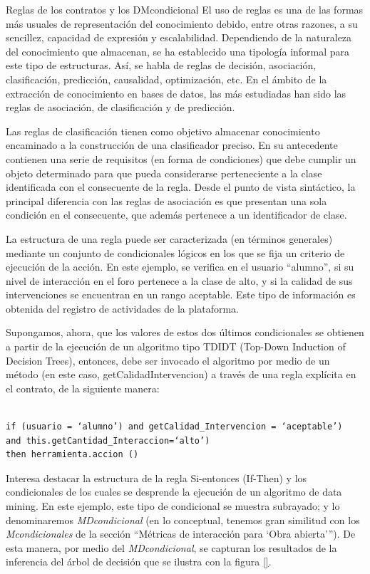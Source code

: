 {Reglas de los contratos y los DMcondicional El uso de reglas es una de las
formas más usuales de representación del conocimiento debido, entre otras
razones, a su sencillez, capacidad de expresión y escalabilidad. Dependiendo de
la naturaleza del conocimiento que almacenan, se ha establecido una tipología
informal para este tipo de estructuras. Así, se habla de reglas de decisión,
asociación, clasificación, predicción, causalidad, optimización, etc. En el
ámbito de la extracción de conocimiento en bases de datos, las más estudiadas
han sido las reglas de asociación, de clasificación y de predicción.


Las reglas de clasificación tienen como objetivo almacenar
conocimiento encaminado a la construcción de una clasificador preciso. En su
antecedente contienen una serie de requisitos (en forma de condiciones) que debe
cumplir un objeto determinado para que pueda considerarse perteneciente a la
clase identificada con el consecuente de la regla. Desde el punto de
vista sintáctico, la principal diferencia con las reglas de asociación es que 
presentan una sola condición en el consecuente, que además pertenece a un
identificador de clase.


La estructura de una regla puede ser caracterizada (en términos
generales) mediante un conjunto de condicionales lógicos en los que se fija un
criterio de ejecución de la acción. En este ejemplo, se verifica en el usuario
“alumno”, si su nivel de interacción en el foro pertenece a la clase de alto, y
si la calidad de sus intervenciones se encuentran en un rango aceptable. Este
tipo de información es obtenida del registro de actividades de la plataforma.


Supongamos, ahora, que los valores de estos dos últimos condicionales se
obtienen a partir de la ejecución de un algoritmo tipo TDIDT (Top-Down Induction
of Decision Trees), entonces, debe ser invocado el algoritmo por medio de un
método (en este caso, getCalidadIntervencion) a través de una regla explícita
en el contrato, de la siguiente manera:

\begin{verbatim}

if (usuario = ‘alumno’) and getCalidad_Intervencion = ‘aceptable’)
and this.getCantidad_Interaccion=‘alto’)
then herramienta.accion ()

\end{verbatim} 

Interesa destacar la estructura de la regla Si-entonces (If-Then) y los condicionales
de los cuales se desprende la ejecución de un algoritmo de data mining.
En este ejemplo, este tipo de condicional se muestra subrayado; y lo denominaremos
\textit{MDcondicional} (en lo conceptual, tenemos gran similitud con los
\textit{Mcondicionales} de la sección “Métricas de interacción para ‘Obra
abierta’”). De esta manera, por medio del \textit{MDcondicional}, se capturan
los resultados de la inferencia del árbol de decisión que se ilustra con la
figura \ref{}.

}

